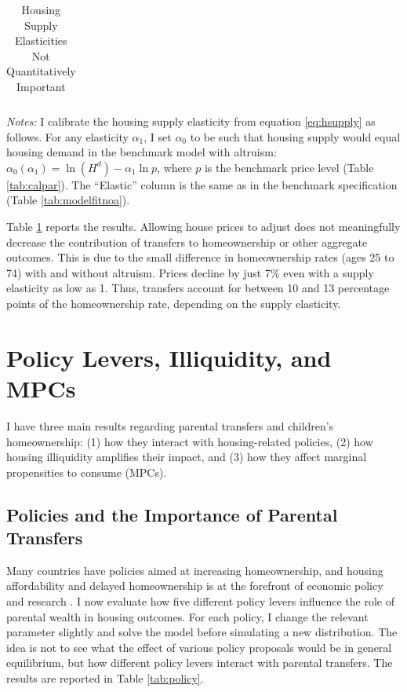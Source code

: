 \documentclass[12pt]{article}
\begin{document}
\begin{table}
	\center 
	\begin{threeparttable}
		\caption{Housing Supply Elasticities Not Quantitatively Important}\label{tab:quant_endogenprices}
		
		\begin{tabular}{@{}llll@{}}
			
		\end{tabular}
		
	\end{threeparttable}
	{\begin{footnotesize}\begin{flushleft}\vspace{-0.1in}%
		\textit{Notes:} I calibrate the housing supply elasticity from equation \eqref{eq:hsupply} as follows. For any elasticity $\alpha_1$, I set $\alpha_0$ to be such that housing supply would equal housing demand in the benchmark model with altruism: $\alpha_0(\alpha_1) = \ln(H^d) - \alpha_1 \ln p$, where $p$ is the benchmark price level (Table \ref{tab:calpar}). The ``Elastic'' column is the same as in the benchmark specification (Table \ref{tab:modelfitnoa}).
	\end{flushleft}\end{footnotesize}}		
\end{table}

Table \ref{tab:quant_endogenprices} reports the results. Allowing house prices to adjust does not meaningfully decrease the contribution of transfers to homeownership or other aggregate outcomes. This is due to the small difference in homeownership rates (ages 25 to 74) with and without altruism. Prices decline by just 7\% even with a supply elasticity as low as 1. Thus, transfers account for between 10 and 13 percentage points of the homeownership rate, depending on the supply elasticity.

\section{Policy Levers, Illiquidity, and MPCs}\label{sec:pol}
I have three main results regarding parental transfers and children's homeownership: (1) how they interact with housing-related policies, (2) how housing illiquidity amplifies their impact, and (3) how they affect marginal propensities to consume (MPCs).

\subsection{Policies and the Importance of Parental Transfers}
Many countries have policies aimed at increasing homeownership, and housing affordability and delayed homeownership is at the forefront of economic policy and research \citep[see e.g.,][]{Mabille2020}. I now evaluate how five different policy levers influence the role of parental wealth in housing outcomes. For each policy, I change the relevant parameter slightly and solve the model before simulating a new distribution. The idea is not to see what the effect of various policy proposals would be in general equilibrium, but how different policy levers interact with parental transfers. The results are reported in Table \ref{tab:policy}. 
\end{document}
